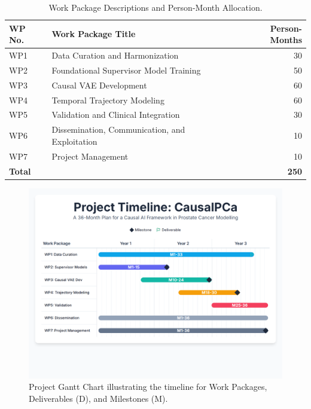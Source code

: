 \documentclass[11pt, a4paper]{article}
\begin{document}
\begin{table}[H]
    \centering
    \caption{Work Package Descriptions and Person-Month Allocation.}
    \label{tab:wp_descriptions}
    \small
    \begin{tabular}{lp{9cm}r}
        \toprule
        \textbf{WP No.} & \textbf{Work Package Title} & \textbf{Person-Months} \\
        \midrule
        WP1 & Data Curation and Harmonization & 30 \\
        WP2 & Foundational Supervisor Model Training & 50 \\
        WP3 & Causal VAE Development & 60 \\
        WP4 & Temporal Trajectory Modeling & 60 \\
        WP5 & Validation and Clinical Integration & 30 \\
        WP6 & Dissemination, Communication, and Exploitation & 10 \\
        WP7 & Project Management & 10 \\
        \midrule
        \multicolumn{2}{l}{\textbf{Total}} & \textbf{250} \\
        \bottomrule
    \end{tabular}
\end{table}

\begin{figure}[H]
    \centering
    \includegraphics[width=\textwidth]{gantt.png}
    \caption{Project Gantt Chart illustrating the timeline for Work Packages, Deliverables (D), and Milestones (M).}
    \label{fig:gantt}
\end{figure}
\end{document}
